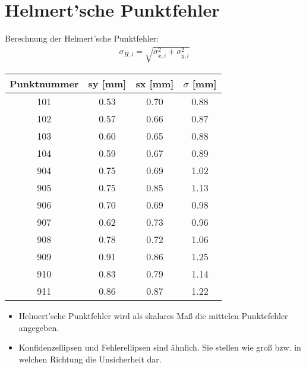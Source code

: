 \documentclass[12pt
,headinclude
,headsepline
,bibtotocnumbered
]{scrartcl}
\begin{document}
\section{Helmert'sche Punktfehler}
Berechnung der Helmert'sche Punktfehler:
\begin{align*}
	\sigma_{H,i}=\sqrt{\sigma_{x,i}^{2}+\sigma_{y,i}^2}
\end{align*}
\begin{table}[H]
	\centering
	\renewcommand\arraystretch{1.3}
	\setlength\tabcolsep{12pt}
	\begin{tabular}{|c|c|c|c|}
		\hline
		Punktnummer&sy [mm]&sx [mm]&$\sigma$ [mm]\\\hline
		101&0.53&0.70&0.88\\\hline
		102&0.57&0.66&0.87\\\hline
		103&0.60&0.65&0.88\\\hline
		104&0.59&0.67&0.89\\\hline
		904&0.75&0.69&1.02\\\hline
		905&0.75&0.85&1.13\\\hline
		906&0.70&0.69&0.98\\\hline
		907&0.62&0.73&0.96\\\hline
		908&0.78&0.72&1.06\\\hline
		909&0.91&0.86&1.25\\\hline
		910&0.83&0.79&1.14\\\hline
		911&0.86&0.87&1.22\\\hline
	\end{tabular}
\end{table}
\begin{itemize}
	\item Helmert'sche Punktfehler wird als skalares Maß die mittelen Punktefehler angegeben. 
	\item Konfidenzellipsen und Fehlerellipsen sind ähnlich. Sie stellen wie groß bzw. in welchen Richtung die Unsicherheit dar.
\end{itemize}
\end{document}

